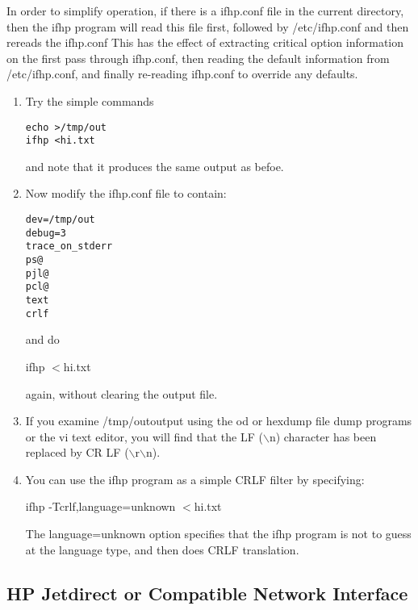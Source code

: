 \documentclass[a4paper]{article}
\begin{document}
In order to simplify operation,
if there is a
{\ttfamily ifhp.conf} file in the current directory,
then the
{\ttfamily ifhp} program will read this file first,
followed by
{\ttfamily /etc/ifhp.conf}
and then rereads the
{\ttfamily ifhp.conf}
This has the effect of extracting critical option information on the
first pass through
{\ttfamily ifhp.conf},
then reading the default information from
{\ttfamily /etc/ifhp.conf},
and finally re-reading
{\ttfamily ifhp.conf} to override any defaults. 
\begin{enumerate}
\item Try the simple commands
\begin{tscreen}
\begin{verbatim}
echo >/tmp/out
ifhp <hi.txt
\end{verbatim}
\end{tscreen}

and note that it produces the same output as befoe.
\item Now modify the
{\ttfamily ifhp.conf} file to contain:
\begin{tscreen}
\begin{verbatim}
dev=/tmp/out
debug=3
trace_on_stderr
ps@ 
pjl@
pcl@
text
crlf
\end{verbatim}
\end{tscreen}

and do
\begin{tscreen}
ifhp $<$hi.txt
\end{tscreen}

again, without clearing the output file.
\item If you examine 
{\ttfamily /tmp/out}output using the 
{\ttfamily od} or {\ttfamily hexdump} file dump programs or the
{\ttfamily vi} text editor,
you will find that the LF
({\ttfamily $\backslash$n}) character has been replaced by
CR LF ({\ttfamily $\backslash$r$\backslash$n}).
\item You can use the
{\ttfamily ifhp}
program as a simple CRLF filter by specifying:
\begin{tscreen}
ifhp -Tcrlf,language=unknown $<$hi.txt
\end{tscreen}

The
{\ttfamily language=unknown} option specifies that the ifhp
program is not to guess at the language type,
and then does CRLF translation.

\end{enumerate}



\subsection{HP Jetdirect or Compatible Network Interface}
\end{document}
